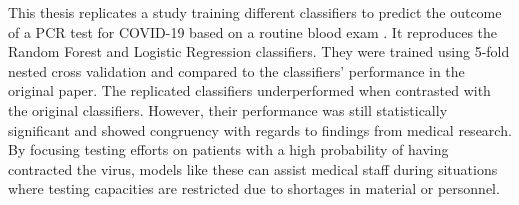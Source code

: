 This thesis replicates a study training different classifiers to predict the 
outcome of a PCR test for COVID-19 based on a routine blood exam \cite{RN127}. 
It reproduces the Random Forest and Logistic Regression classifiers. They were 
trained using 5-fold nested cross validation and compared to the classifiers' 
performance in the original paper. The replicated classifiers underperformed 
when contrasted with the original classifiers. However, their performance was 
still statistically significant and showed congruency with regards to findings 
from medical research. By focusing testing efforts on patients with a high 
probability of having contracted the virus, models like these can assist 
medical staff during situations where testing capacities are restricted due to 
shortages in material or personnel.
